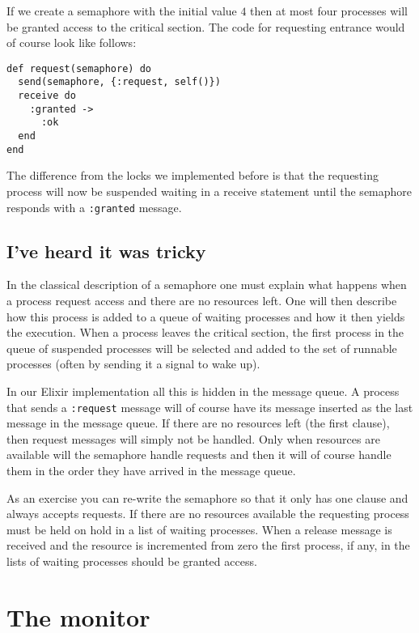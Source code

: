 \documentclass[a4paper,11pt]{article}
\begin{document}
If we create a semaphore with the initial value $4$
then at most four processes will be granted access to the critical
section. The code for requesting entrance would of course look like follows:

\begin{verbatim}
def request(semaphore) do
  send(semaphore, {:request, self()})
  receive do
    :granted ->
      :ok
  end
end
\end{verbatim}

The difference from the locks we implemented before is that the
requesting process will now be suspended waiting in a receive
statement until the semaphore responds with a {\tt :granted} message.


\subsection{I've heard it was tricky}

In the classical description of a semaphore one must explain what
happens when a process request access and there are no resources
left. One will then describe how this process is added to a queue of
waiting processes and how it then yields the execution. When a process
leaves the critical section, the first process in the queue of
suspended processes will be selected and added to the set of runnable
processes (often by sending it a signal to wake up).

In our Elixir implementation all this is hidden in the message
queue. A process that sends a {\tt :request} message will of course
have its message inserted as the last message in the message queue. If
there are no resources left (the first clause), then request messages
will simply not be handled. Only when resources are available will the
semaphore handle requests and then it will of course handle them in the
order they have arrived in the message queue.

As an exercise you can re-write the semaphore so that it only has one
clause and always accepts requests. If there are no resources
available the requesting process must be held on hold in a list of
waiting processes. When a release message is received and the resource
is incremented from zero the first process, if any, in the lists of
waiting processes should be granted access. 



\section{The monitor}
\end{document}
